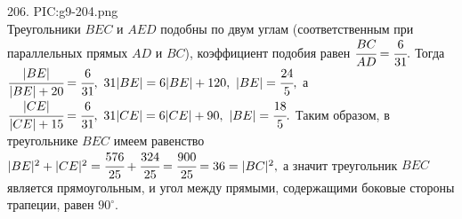 206. {{PIC:g9-204.png}}\\
Треугольники $BEC$ и $AED$ подобны по двум углам (соответственным при параллельных прямых $AD$ и $BC$), коэффициент подобия равен $\cfrac{BC}{AD}=
\cfrac{6}{31}.$ Тогда $\cfrac{|BE|}{|BE|+20}=\cfrac{6}{31},\ 31|BE|=6|BE|+120,\ |BE|=\cfrac{24}{5},$ а $\cfrac{|CE|}{|CE|+15}=\cfrac{6}{31},\ 31|CE|=6|CE|+90,\ |BE|=\cfrac{18}{5}.$ Таким образом, в треугольнике $BEC$ имеем равенство $|BE|^2+|CE|^2=\cfrac{576}{25}+\cfrac{324}{25}=\cfrac{900}{25}=36=|BC|^2,$ а значит треугольник $BEC$ является прямоугольным, и угол между прямыми, содержащими боковые стороны трапеции, равен $90^\circ.$\\

